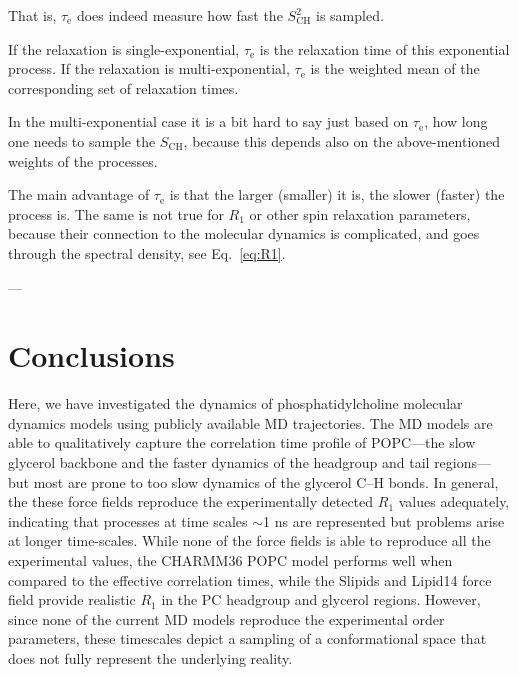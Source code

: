 \documentclass[journal=jpcbfk,manuscript=article,layout=twocolumn]{achemso}
\begin{document}
That is,  $\tau_\mathrm e$ does indeed measure how fast the $S^2_\mathrm{CH}$ is sampled.

If the relaxation is single-exponential, $\tau_\mathrm e$ is the relaxation time of this exponential process. If the relaxation is multi-exponential, $\tau_\mathrm e$ is the weighted mean of the corresponding set of relaxation times.

In the multi-exponential case it is a bit hard to say just based on $\tau_\mathrm e$, how long one needs to sample the $S_\mathrm{CH}$, because this depends also on the above-mentioned weights of the processes.

The main advantage of $\tau_\mathrm e$ is that the larger (smaller) it is, the slower (faster) the process is. The same is not true for $R_1$ or other spin relaxation parameters, because their connection to the molecular dynamics is complicated, and goes through the spectral density, see Eq.~\eqref{eq:R1}.

---


\section{Conclusions}


Here, we have investigated the dynamics of phosphatidylcholine molecular dynamics models using publicly available MD trajectories. The MD models are able to qualitatively capture the correlation time profile of POPC---the slow glycerol backbone and the faster dynamics of the headgroup and tail regions---but most are prone to too slow dynamics of the glycerol C--H bonds.  In general, the these force fields reproduce the experimentally detected $R_{1}$ values adequately, indicating that processes at time scales $\sim$1 ns are represented but problems arise at longer time-scales. While none of the force fields is able to reproduce all the experimental values, the CHARMM36 POPC model performs well when compared to the effective correlation times, while the Slipids and Lipid14 force field provide realistic $R_{1}$ in the PC headgroup and glycerol regions. However, since none of the current MD models reproduce the experimental order parameters, these timescales depict a sampling of a conformational space that does not fully represent the underlying reality.
\end{document}
